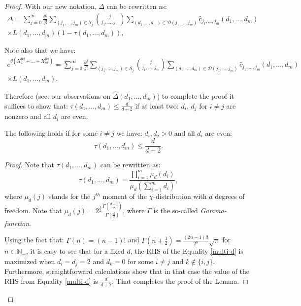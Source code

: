 \begin{proof}
With our new notation, $\Delta$ can be rewritten as:
\begin{gather*}
\Delta = \sum_{j=0}^{\infty} \frac{\theta^{j}}{j!} \sum_{(j_{1},...,j_{m}) \in \mathcal{S}_{j}} \binom{j}{j_{1},\dots,j_{m}} \sum_{(d_{1},...,d_{m}) \in \mathcal{D}(j_{1},...,j_{m})} \widehat{c}_{j_1, \dots, j_m}(d_{1},\dots,d_{m}) \\
\times L(d_{1},...,d_{m})(1-\tau(d_{1},...,d_{m})),
\end{gather*}

Note also that we have:
\begin{gather*}
e^{\theta(X_{1}^{\mathrm{iid}}+...+X_{m}^{\mathrm{iid}})} = \sum_{j=0}^{\infty} \frac{\theta^{j}}{j!} \sum_{(j_{1},...,j_{m}) \in \mathcal{S}_{j}} \binom{j}{j_{1},\dots,j_{m}} \sum_{(d_{1},...,d_{m}) \in \mathcal{D}(j_{1},...,j_{m})} \widehat{c}_{j_1, \dots, j_m}(d_{1},\dots,d_{m}) \\
\times  L(d_{1},...,d_{m}).
\end{gather*}

Therefore (see: our observations on $\widehat{\Delta}(d_{1},...,d_{m})$) to complete the proof it suffices to show that: $\tau(d_{1},...,d_{m}) \leq \frac{d}{d+2}$ if at least two: $d_{i}$, $d_{j}$ for $i \neq j$ are nonzero and all $d_{i}$ are even.
\begin{lemma}
\label{tau-lemma}
The following holds if for some $i \neq j$ we have: $d_{i}, d_{j} > 0$ and all $d_{i}$ are even:
\begin{equation}
\tau(d_{1},...,d_{m}) \leq \frac{d}{d+2}.    
\end{equation}
\end{lemma}
\begin{proof}
Note that $\tau(d_{1},...,d_{m})$ can be rewritten as:
\begin{equation}
\label{multi-d}
\tau(d_{1},...,d_{m}) = \frac{\prod_{i=1}^{m} \mu_{d}(d_{i})}{\mu_{d}(\sum_{i=1}^{m} d_i)},    
\end{equation}
where $\mu_{d}(j)$ stands for the $j^{th}$ moment of the $\chi$-distribution with $d$ degrees of freedom.
Note that $\mu_{d}(j) = 2^{\frac{j}{2}}
\frac{\Gamma(\frac{d+j}{2})}{\Gamma(\frac{d}{2})}$,
where $\Gamma$ is the so-called \textit{Gamma-function}.

Using the fact that: $\Gamma(n) = (n-1)!$ and $\Gamma(n+\frac{1}{2})=\frac{(2n-1)!!}{2^{n}}\sqrt{\pi}$ for $n \in \mathbb{N}_{+}$, it is easy to see 
that for a fixed $d$, the RHS of the Equality \ref{multi-d} is maximized when $d_{i}=d_{j}=2$ and $d_{k}=0$ for some $i \neq j$ and $k \notin \{i,j\}$. Furthermore, straightforward calculations show that in that case the value of the RHS from Equality \ref{multi-d} is $\frac{d}{d+2}$. That completes the proof of the Lemma.
\end{proof}



\end{proof}
